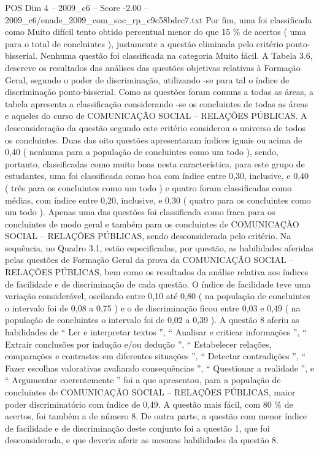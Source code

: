 \begin{textsample}{POS Dim 4 – 2009\_c6 – Score -2.00 – 2009\_c6/enade\_2009\_com\_soc\_rp\_c9c58bdcc7.txt}
Por fim, uma foi classificada como Muito difícil tento obtido percentual menor do que 15 \% de acertos ( uma para o total de concluintes ), justamente a questão eliminada pelo critério ponto-bisserial.
Nenhuma questão foi classificada na categoria Muito fácil.
A Tabela 3.6, descreve os resultados das análises das questões objetivas relativas à Formação Geral, segundo o poder de discriminação, utilizando -se para tal o índice de discriminação ponto-bisserial.
Como as questões foram comuns a todas as áreas, a tabela apresenta a classificação considerando -se os concluintes de todas as áreas e aqueles do curso de COMUNICAÇÃO SOCIAL – RELAÇÕES PÚBLICAS.
A desconsideração da questão segundo este critério considerou o universo de todos os concluintes.
Duas das oito questões apresentaram índices iguais ou acima de 0,40 ( nenhuma para a população de concluintes como um todo ), sendo, portanto, classificadas como muito boas nesta característica, para este grupo de estudantes, uma foi classificada como boa com índice entre 0,30, inclusive, e 0,40 ( três para os concluintes como um todo ) e quatro foram classificadas como médias, com índice entre 0,20, inclusive, e 0,30 ( quatro para os concluintes como um todo ).
Apenas uma das questões foi classificada como fraca para os concluintes de modo geral e também para os concluintes de COMUNICAÇÃO SOCIAL – RELAÇÕES PÚBLICAS, sendo desconsiderada pelo critério.
Na sequência, no Quadro 3.1, estão especificadas, por questão, as habilidades aferidas pelas questões de Formação Geral da prova da COMUNICAÇÃO SOCIAL – RELAÇÕES PÚBLICAS, bem como os resultados da análise relativa aos índices de facilidade e de discriminação de cada questão.
O índice de facilidade teve uma variação considerável, oscilando entre 0,10 até 0,80 ( na população de concluintes o intervalo foi de 0,08 a 0,75 ) e o de discriminação ficou entre 0,03 e 0,49 ( na população de concluintes o intervalo foi de 0,02 a 0,39 ).
A questão 8 aferiu as habilidades de “ Ler e interpretar textos ”, “ Analisar e criticar informações ”, “ Extrair conclusões por indução e/ou dedução ”, “ Estabelecer relações, comparações e contrastes em diferentes situações ”, “ Detectar contradições ”, “ Fazer escolhas valorativas avaliando consequências ”, “ Questionar a realidade ”, e “ Argumentar coerentemente ” foi a que apresentou, para a população de concluintes de COMUNICAÇÃO SOCIAL – RELAÇÕES PÚBLICAS, maior poder discriminatório com índice de 0,49.
A questão mais fácil, com 80 \% de acertos, foi também a de número 8.
De outra parte, a questão com menor índice de facilidade e de discriminação deste conjunto foi a questão 1, que foi desconsiderada, e que deveria aferir as mesmas habilidades da questão 8.

\end{textsample}
